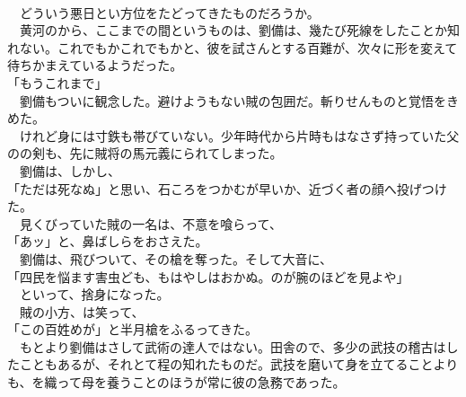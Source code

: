 \documentclass[
  paper=a5,
  fontsize=10pt,
  jafontsize=9.5pt,
  tate,                  %
  open_bracket_pos=nibu, %
]{jlreq}
\begin{document}
\\


　どういう悪日とい方位をたどってきたものだろうか。\\


　黄河のから、ここまでの間というものは、劉備は、幾たび死線をしたことか知れない。これでもかこれでもかと、彼を試さんとする百難が、次々に形を変えて待ちかまえているようだった。\\


「もうこれまで」\\


　劉備もついに観念した。避けようもない賊の包囲だ。斬りせんものと覚悟をきめた。\\


　けれど身には寸鉄も帯びていない。少年時代から片時もはなさず持っていた父のの剣も、先に賊将の馬元義にられてしまった。\\


　劉備は、しかし、\\


「ただは死なぬ」と思い、石ころをつかむが早いか、近づく者の顔へ投げつけた。\\


　見くびっていた賊の一名は、不意を喰らって、\\


「あッ」と、鼻ばしらをおさえた。\\


　劉備は、飛びついて、その槍を奪った。そして大音に、\\


「四民を悩ます害虫ども、もはやしはおかぬ。のが腕のほどを見よや」\\


　といって、捨身になった。\\


　賊の小方、は笑って、\\


「この百姓めが」と半月槍をふるってきた。\\


　もとより劉備はさして武術の達人ではない。田舎ので、多少の武技の稽古はしたこともあるが、それとて程の知れたものだ。武技を磨いて身を立てることよりも、を織って母を養うことのほうが常に彼の急務であった。\\
\end{document}
